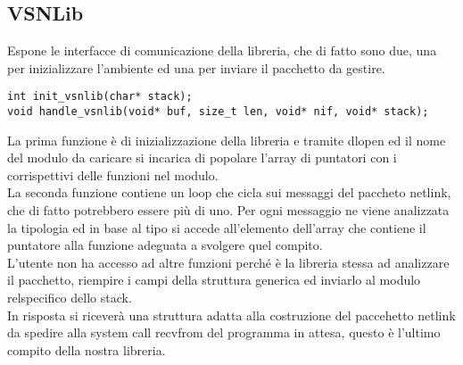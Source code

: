 \subsection{VSNLib}
Espone le interfacce di comunicazione della libreria, che di fatto sono due, una per inizializzare l'ambiente ed una per inviare il pacchetto da gestire.\\
\begin{lstlisting}[style=CStyle]
int init_vsnlib(char* stack);
void handle_vsnlib(void* buf, size_t len, void* nif, void* stack);
\end{lstlisting}
La prima funzione \`e di inizializzazione della libreria e tramite dlopen ed il nome del modulo da caricare si incarica di popolare l'array di puntatori con i corrispettivi delle funzioni nel modulo.\\
La seconda funzione contiene un loop che cicla sui messaggi del paccheto netlink, che di fatto potrebbero essere pi\`u di uno. Per ogni messaggio ne viene analizzata la tipologia ed in base al tipo si accede all'elemento dell'array che contiene il puntatore alla funzione adeguata a svolgere quel compito.\\
L'utente non ha accesso ad altre funzioni perch\'e \`e la libreria stessa ad analizzare il pacchetto, riempire i campi della struttura generica ed inviarlo al modulo relspecifico dello stack.\\
In risposta si ricever\`a una struttura adatta alla costruzione del paccehetto netlink da spedire alla system call recvfrom del programma in attesa, questo \`e l'ultimo compito della nostra libreria.
